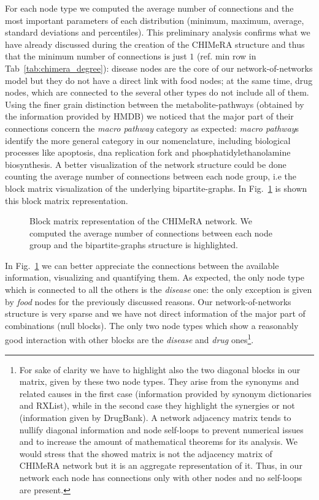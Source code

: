 \documentclass{standalone}
\begin{document}
For each node type we computed the average number of connections and the most important parameters of each distribution (minimum, maximum, average, standard deviations and percentiles).
This preliminary analysis confirms what we have already discussed during the creation of the \textsf{CHIMeRA} structure and thus that the minimum number of connections is just $1$ (ref. min row in Tab~\ref{tab:chimera_degree}): disease nodes are the core of our network-of-networks model but they do not have a direct link with food nodes; at the same time, drug nodes, which are connected to the several other types do not include all of them.
Using the finer grain distinction between the metabolite-pathways (obtained by the information provided by HMDB) we noticed that the major part of their connections concern the \emph{macro pathway} category as expected: \emph{macro pathway}s identify the more general category in our nomenclature, including biological processes like \textsf{apoptosis}, \textsf{dna replication fork} and \textsf{phosphatidylethanolamine biosynthesis}.
A better visualization of the network structure could be done counting the average number of connections between each node group, i.e the block matrix visualization of the underlying bipartite-graphs.
In Fig.~\ref{fig:chimera_bipartite} is shown this block matrix representation.

\begin{figure}[htbp]
\centering
\def\svgwidth{\textwidth}

\caption{Block matrix representation of the \textsf{CHIMeRA} network.
We computed the average number of connections between each node group and the bipartite-graphs structure is highlighted.
}
\label{fig:chimera_bipartite}
\end{figure}

In Fig.~\ref{fig:chimera_bipartite} we can better appreciate the connections between the available information, visualizing and quantifying them.
As expected, the only node type which is connected to all the others is the \emph{disease} one: the only exception is given by \emph{food} nodes for the previously discussed reasons.
Our network-of-networks structure is very sparse and we have not direct information of the major part of combinations (null blocks).
The only two node types which show a reasonably good interaction with other blocks are the \emph{disease} and \emph{drug} ones\footnote{
  For sake of clarity we have to highlight also the two diagonal blocks in our matrix, given by these two node types.
  They arise from the synonyms and related causes in the first case (information provided by synonym dictionaries and RXList), while in the second case they highlight the synergies or not (information given by DrugBank).
  A network adjacency matrix tends to nullify diagonal information and node self-loops to prevent numerical issues and to increase the amount of mathematical theorems for its analysis.
  We would stress that the showed matrix is not the adjacency matrix of \textsf{CHIMeRA} network but it is an aggregate representation of it.
  Thus, in our network each node has connections only with other nodes and no self-loops are present.
}.
\end{document}
